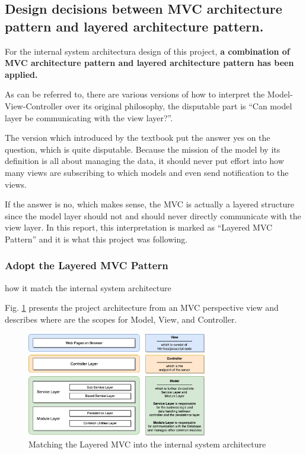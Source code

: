 \documentclass[conference]{IEEEtran}
\begin{document}
\subsection{Design decisions between MVC architecture pattern and layered architecture pattern.}
\label{sec:1.3}


For the internal system architectura design of this project,
\textbf{a combination of MVC architecture pattern and layered architecture pattern has been applied.}

As can be referred to\cite{mvc_versions}, there are various versions of how to interpret the Model-View-Controller over its original philosophy,
the disputable part is \textquotedblleft Can model layer be communicating with the view layer?\textquotedblright .

The version which introduced by the textbook\cite{textbook} put the answer yes on the question, which is quite disputable.
Because the mission of the model by its definition is all about managing the data,
it should never put effort into how many views are subscribing to which models and even send notification to the views.

If the answer is no, which makes sense, the MVC is actually a layered structure\cite{mvc_2,mvc_3}
since the model layer should not and should never directly communicate with the view layer.
In this report, this interpretation is marked as \textquotedblleft Layered MVC Pattern\textquotedblright
and it is what this project was following.

\subsubsection{\textbf{Adopt the Layered MVC Pattern}} how it match the internal system architecture

Fig. \ref{fig:mvc-arch} presents the project architecture from an MVC perspective view
and describes where are the scopes for Model, View, and Controller.

\begin{figure}[!ht]
	\centering
	\includegraphics[width=0.7\textwidth]{mvc-arch.png}
	\caption{Matching the Layered MVC into the internal system architecture}
	\label{fig:mvc-arch}
\end{figure}
\end{document}
